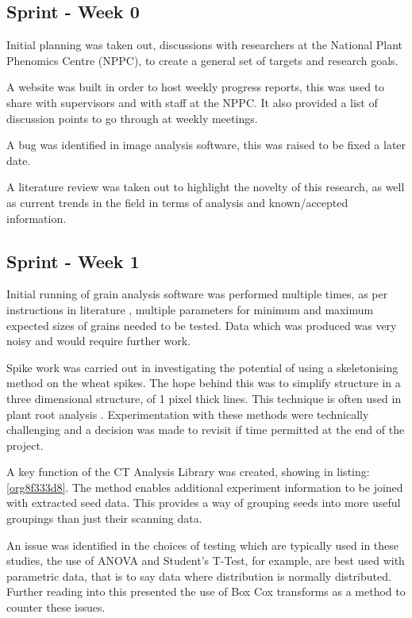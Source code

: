\documentclass[11pt]{report}
\begin{document}
\subsection{Sprint - Week 0}
\label{sec:org6fdce58}
Initial planning was taken out, discussions with researchers at the National Plant Phenomics Centre (NPPC), to create a general set of targets and research goals.

A website was built in order to host weekly progress reports, this was used to share with supervisors and with staff at the NPPC. It also provided a list of discussion points to go through at weekly meetings.

A bug was identified in image analysis software, this was raised to be fixed a later date.

A literature review was taken out to highlight the novelty of this research, as well as current trends in the field in terms of analysis and known/accepted information.

\subsection{Sprint - Week 1}
\label{sec:org5a91dee}

Initial running of grain analysis software was performed multiple times, as per instructions in literature \cite{Hughes2017}, multiple parameters for minimum and maximum expected sizes of grains needed to be tested. Data which was produced was very noisy and would require further work.

Spike work was carried out in investigating the potential of using a skeletonising method on the wheat spikes. The hope behind this was to simplify structure in a three dimensional structure, of 1 pixel thick lines. This technique is often used in plant root analysis \cite{Mairhofer2015,Daly2017}. Experimentation with these methods were technically challenging and a decision was made to revisit if time permitted at the end of the project.

A key function of the CT Analysis Library was created, showing in listing:\ref{org8f333d8}. The method enables additional experiment information to be joined with extracted seed data. This provides a way of grouping seeds into more useful groupings than just their scanning data.

An issue was identified in the choices of testing which are typically used in these studies, the use of ANOVA and Student's T-Test, for example, are best used with parametric data, that is to say data where distribution is normally distributed. Further reading into this presented the use of Box Cox transforms as a method to counter these issues.
\end{document}
